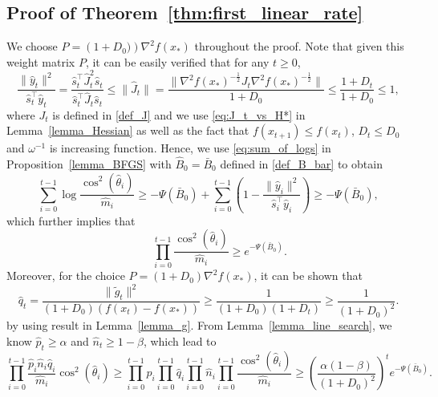 \documentclass[11pt,letterpaper]{article}
\newcommand\0{{\Vector{0}}}
\newcommand\1{{\Vector{1}}}
\numberwithin{assumption}{section}
\numberwithin{definition}{section}
\numberwithin{theorem}{section}
\numberwithin{remark}{section}
\begin{document}
\subsection{Proof of Theorem~\ref{thm:first_linear_rate}}\label{proof_thm_first_linear}

    We choose $P = \left(1 + D_0)\right)\nabla^2{f(x_*)}$ throughout the proof. Note that given this weight matrix $P$, it can be easily verified that for any $t \geq 0$,
    \begin{equation}
        \frac{\|\hat{y}_t\|^2}{\hat{s}_t^\top \hat{y}_t} = \frac{\hat{s}_t^\top \hat{J}_t^2 \hat{s}_t}{\hat{s}_t^\top \hat{J}_t \hat{s}_t} \leq \|\hat{J}_t\| = \frac{\|\nabla^2{f(x_*)}^{-\frac{1}{2}}J_t \nabla^2{f(x_*)}^{-\frac{1}{2}}\|}{1 + D_0} \leq \frac{1 + D_t}{1 + D_0} \leq 1,
    \end{equation}
    where $J_t$ is defined in \eqref{def_J} and we use \eqref{eq:J_t_vs_H*} in Lemma~\ref{lemma_Hessian} as well as the fact that $f(x_{t + 1}) \leq f(x_t)$, $D_t \leq D_0$ and $\omega^{-1}$ is increasing function. Hence, we use \eqref{eq:sum_of_logs} in Proposition~\ref{lemma_BFGS} with $\hat{B}_0 = \bar{B}_0$ defined in \eqref{def_B_bar} to obtain
    \begin{equation*}
        \sum_{i = 0}^{t - 1} \log{\frac{\cos^2(\hat{\theta}_i)}{\hat{m}_i}} \geq  - \Psi(\bar{B}_{0}) + \sum_{i = 0}^{t - 1}\left(1-\frac{\|\hat{y}_i\|^2}{\hat{s}_i^\top \hat{y}_i} \right) \geq - \Psi(\bar{B}_{0}),
    \end{equation*}
    which further implies that 
    \begin{equation*}%
    \qquad \prod_{i = 0}^{t-1} \frac{\cos^2(\hat{\theta}_i)}{\hat{m}_i} \geq e^{-\Psi(\bar{B}_{0})}.
    \end{equation*}
    Moreover, for the choice $P = \left(1 + D_0\right)\nabla^2{f(x_*)}$, it can be shown that
    \begin{equation}
        \hat{q}_t = \frac{\|\tilde{g}_t\|^2}{(1 + D_0)(f(x_t) - f(x_*))} \geq \frac{1}{(1 + D_0)(1 + D_t)} \geq \frac{1}{(1 + D_0)^2}.
    \end{equation}
    by using result in Lemma~\ref{lemma_g}. From Lemma~\ref{lemma_line_search}, we know $\hat{p}_t \geq \alpha$ and $\hat{n}_t\geq 1 - \beta$, which lead to
    \begin{equation*}
        \prod_{i=0}^{t-1} \frac{\hat{p}_i \hat{n}_i \hat{q}_i}{\hat{m}_i} \cos^2(\hat{\theta}_i) \geq \prod_{i=0}^{t-1} \hat{p}_i \prod_{i=0}^{t-1} \hat{q}_i \prod_{i=0}^{t-1} \hat{n}_i \prod_{i=0}^{t-1} \frac{\cos^2(\hat{\theta}_i)}{\hat{m}_i} \geq \left(\frac{\alpha(1 - \beta)}{(1 + D_0)^2}\right)^t  e^{-\Psi(\bar{B}_{0})}.
    \end{equation*}
\end{document}
